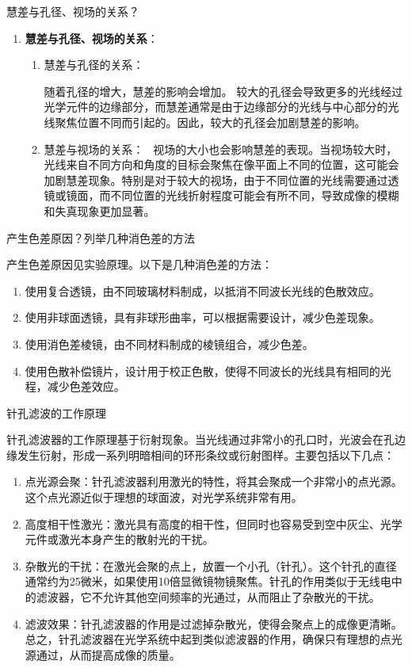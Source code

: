\documentclass[dvipsnames, svgnames,a4paper,11pt]{article}
\begin{document}
	\begin{question}
		慧差与孔径、视场的关系？
	\end{question}
	\begin{enumerate}
		\item \textbf{慧差与孔径、视场的关系}：
		\begin{enumerate}
			\item 慧差与孔径的关系：
		
				随着孔径的增大，慧差的影响会增加。
				较大的孔径会导致更多的光线经过光学元件的边缘部分，而慧差通常是由于边缘部分的光线与中心部分的光线聚焦位置不同而引起的。因此，较大的孔径会加剧慧差的影响。
			
			
			\item 慧差与视场的关系：
			\
				视场的大小也会影响慧差的表现。当视场较大时，光线来自不同方向和角度的目标会聚焦在像平面上不同的位置，这可能会加剧慧差现象。特别是对于较大的视场，由于不同位置的光线需要通过透镜或镜面，而不同位置的光线折射程度可能会有所不同，导致成像的模糊和失真现象更加显著。
			
		\end{enumerate}
	\end{enumerate}
	
	\begin{question}
			产生色差原因？列举几种消色差的方法
	\end{question}
	产生色差原因见实验原理。以下是几种消色差的方法：
\begin{enumerate}
    \item 使用复合透镜，由不同玻璃材料制成，以抵消不同波长光线的色散效应。
    \item 使用非球面透镜，具有非球形曲率，可以根据需要设计，减少色差现象。
    \item 使用消色差棱镜，由不同材料制成的棱镜组合，减少色差。
    \item 使用色散补偿镜片，设计用于校正色散，使得不同波长的光线具有相同的光程，减少色差效应。
\end{enumerate}
	\begin{question}
		针孔滤波的工作原理
	\end{question}
	针孔滤波器的工作原理基于衍射现象。当光线通过非常小的孔口时，光波会在孔边缘发生衍射，形成一系列明暗相间的环形条纹或衍射图样。主要包括以下几点：
\begin{enumerate}
	

	\item 点光源会聚：针孔滤波器利用激光的特性，将其会聚成一个非常小的点光源。这个点光源近似于理想的球面波，对光学系统非常有用。
	\item 高度相干性激光：激光具有高度的相干性，但同时也容易受到空中灰尘、光学元件或激光本身产生的散射光的干扰。
	\item 杂散光的干扰：在激光会聚的点上，放置一个小孔（针孔）。这个针孔的直径通常约为25微米，如果使用10倍显微镜物镜聚焦。针孔的作用类似于无线电中的滤波器，它不允许其他空间频率的光通过，从而阻止了杂散光的干扰。
	\item 滤波效果：针孔滤波器的作用是过滤掉杂散光，使得会聚点上的成像更清晰。
	总之，针孔滤波器在光学系统中起到类似滤波器的作用，确保只有理想的点光源通过，从而提高成像的质量。
\end{enumerate}
\end{document}
